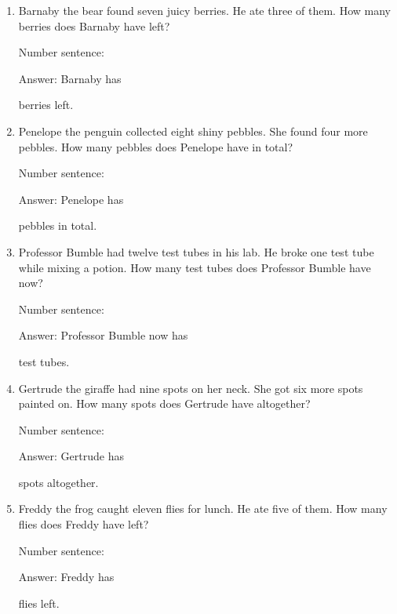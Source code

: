 \documentclass{tufte-book}
\begin{document}
\begin{enumerate}

\item
  Barnaby the bear found seven juicy berries. He ate three of them. How
  many berries does Barnaby have left?\medskip\par
  Number sentence:
  \dotfill\medskip\par
  Answer: Barnaby has
  \dotfill\medskip\par\mbox{}\dotfill\medskip\par\mbox{}\dotfill\bigskip
  berries left.
\item
  Penelope the penguin collected eight shiny pebbles. She found four
  more pebbles. How many pebbles does Penelope have in total?\medskip\par
  Number sentence:
  \dotfill\medskip\par
  Answer: Penelope has
  \dotfill\medskip\par\mbox{}\dotfill\medskip\par\mbox{}\dotfill\bigskip
  pebbles in total.
\item
  Professor Bumble had twelve test tubes in his lab. He broke one test
  tube while mixing a potion. How many test tubes does Professor Bumble
  have now?\medskip\par
  Number sentence:
  \dotfill\medskip\par
  Answer: Professor Bumble now has
  \dotfill\medskip\par\mbox{}\dotfill\medskip\par\mbox{}\dotfill\bigskip
  test tubes.
\item
  Gertrude the giraffe had nine spots on her neck. She got six more
  spots painted on. How many spots does Gertrude have altogether?\medskip\par
  Number sentence:
  \dotfill\medskip\par
  Answer: Gertrude has
  \dotfill\medskip\par\mbox{}\dotfill\medskip\par\mbox{}\dotfill\bigskip
  spots altogether.
\item
  Freddy the frog caught eleven flies for lunch. He ate five of them.
  How many flies does Freddy have left?\medskip\par
  Number sentence:
  \dotfill\medskip\par
  Answer: Freddy has
  \dotfill\medskip\par\mbox{}\dotfill\medskip\par\mbox{}\dotfill\bigskip
  flies left.

\end{enumerate}
\end{document}
